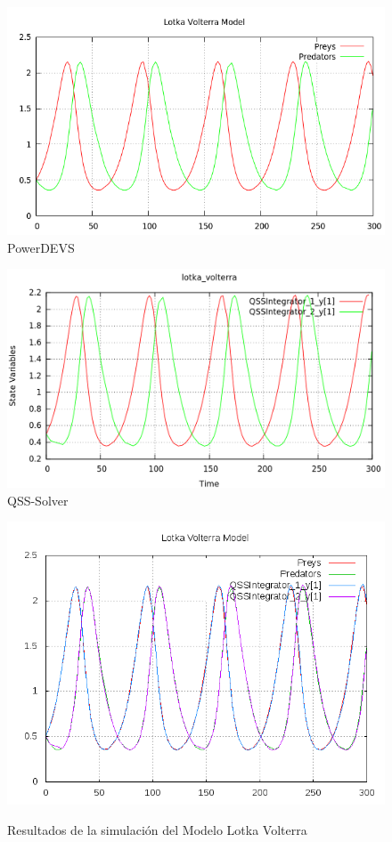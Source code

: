 \begin{figure}[H]
\centering
\begin{minipage}{0.5\textwidth}
\centering
 \includegraphics[width=\linewidth]{lotka_volterra-pd.png}
PowerDEVS \\
\end{minipage}\hfill
\begin{minipage}{0.5\textwidth}
\centering
 \includegraphics[width=\linewidth]{lotka_volterra-qss.png}
QSS-Solver \\
\end{minipage}
\includegraphics[width=\textwidth]{output/lotka_volterra/lotka_volterra-all.png}
\label{graph:lotka_volterra}
\caption{Resultados de la simulación del Modelo Lotka Volterra}
\end{figure}

